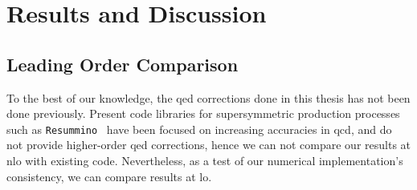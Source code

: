 



\section{Results and Discussion}

\subsection{Leading Order Comparison}

To the best of our knowledge, the \gls{qed} corrections done in this thesis has not been done previously.
Present code libraries for supersymmetric production processes such as \texttt{Resummino}~\cite{Fiaschi:2023tkq} have been focused on increasing accuracies in \gls{qcd}, and do not provide higher-order \gls{qed} corrections, hence we can not compare our results at \gls{nlo} with existing code.
Nevertheless, as a test of our numerical implementation's consistency, we can compare results at \gls{lo}.

